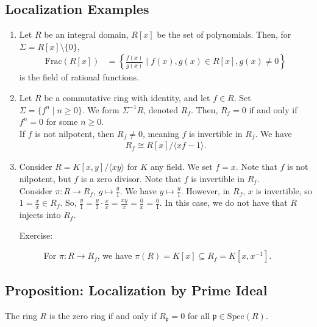 \documentclass[8pt]{extarticle}
\begin{document}
  \subsection{Localization Examples}%
  \begin{enumerate}[(1)]
    \item Let $R$ be an integral domain, $R[x]$ be the set of polynomials. Then, for $\Sigma = R[x]\setminus \{0\}$,
      \begin{align*}
        \text{Frac}(R[x]) &= \left\{\frac{f(x)}{g(x)}\mid f(x),g(x)\in R[x],g(x)\neq 0\right\}
      \end{align*}
      is the field of rational functions.
    \item Let $R$ be a commutative ring with identity, and let $f\in R$. Set $\Sigma = \{f^{n}\mid n\geq 0\}$. We form $\Sigma^{-1}R $, denoted $ R_{f}$. Then, $R_f = 0$ if and only if $f^{n} = 0$ for some $n\geq 0$.\\

      If $f$ is not nilpotent, then $R_f \neq 0$, meaning $f$ is invertible in $R_f$. We have
      \begin{align*}
        R_f \cong R[x]/\langle xf-1\rangle.
      \end{align*}
    \item Consider $R = K[x,y]/\langle xy\rangle$ for $K$ any field. We set $f = x$. Note that $f$ is not nilpotent, but $f$ is a zero divisor. Note that $f$ is invertible in $R_f$.\\

      Consider $\pi: R\rightarrow R_f$, $g \mapsto \frac{g}{1}$. We have $y\mapsto \frac{y}{1}$. However, in $R_f$, $x$ is invertible, so $1=\frac{x}{x}\in R_f$. So, $\frac{y}{1} = \frac{y}{1}\cdot \frac{x}{x} = \frac{xy}{x} = \frac{0}{x} = \frac{0}{1}$. In this case, we do not have that $R$ injects into $R_f$.
      \begin{description}
        \item[Exercise:] For $\pi: R\rightarrow R_f$, we have $\pi(R) = K[x]\subseteq R_f = K[x,x^{-1}]$.
      \end{description}
  \end{enumerate}
  \subsection{Proposition: Localization by Prime Ideal}%
  The ring $R$ is the zero ring if and only if $R_\mathfrak{p} = 0$ for all $\mathfrak{p}\in \text{Spec}(R)$.\\
\end{document}
